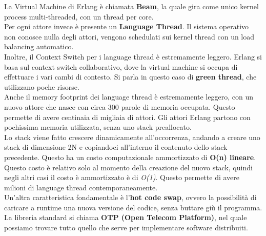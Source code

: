 \documentclass{article}
\begin{document}
La Virtual Machine di Erlang è chiamata \textbf{Beam}, la quale gira come unico kernel process multi-threaded, con un thread per core.\\
Per ogni attore invece è presente un \textbf{Language Thread}. Il sistema operativo non conosce nulla degli attori, vengono schedulati sui kernel thread con un load balancing automatico.\vspace{14pt}\\
Inoltre, il Context Switch per i language thread è estremamente leggero. Erlang si basa sul context switch collaborativo, dove la virtual machine si occupa di effettuare i vari cambi di contesto. Si parla in questo caso di \textbf{green thread}, che utilizzano poche risorse.\vspace{14pt}\\
Anche il memory footprint dei language thread è estremamente leggero, con un nuovo attore che nasce con circa 300 parole di memoria occupata. Questo permette di avere centinaia di migliaia di attori. Gli attori Erlang partono con pochissima memoria utilizzata, senza uno stack preallocato.\\
Lo stack viene fatto crescere dinamicamente all'occorrenza, andando a creare uno stack di dimensione 2N e copiandoci all'interno il contenuto dello stack precedente. Questo ha un costo computazionale ammortizzato di \textbf{O(n) lineare}.\\
Questo costo è relativo solo al momento della creazione del nuovo stack, quindi negli altri casi il costo è ammortizzato è di \textit{O(1)}. Questo permette di avere milioni di language thread contemporaneamente.\vspace{14pt}\\
Un'altra caratteristica fondamentale è l'\textbf{hot code swap}, ovvero la possibilità di caricare a runtime una nuova versione del codice, senza buttare giù il programma.\vspace{14pt}\\
La libreria standard si chiama \textbf{OTP (Open Telecom Platform)}, nel quale possiamo trovare tutto quello che serve per implementare software distribuiti.
\end{document}
